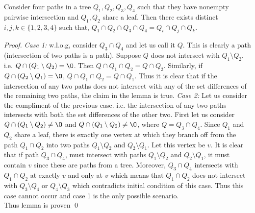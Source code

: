 \documentclass[MS]             %
              {iitmdiss_as}    %
\begin{document}
\begin{lemma}
  \label{lem:fourpaths} Consider four paths in a tree $Q_1, Q_2, Q_3,
  Q_4$ such that they have nonempty pairwise intersection and $Q_1,
  Q_2$ share a leaf. Then there exists distinct $i, j, k \in
  \{1,2,3,4\}$ such that, $Q_1 \cap Q_2 \cap Q_3 \cap Q_4 = Q_i \cap
  Q_j \cap Q_k$.
\end{lemma}
\begin{proof}
  {\em Case 1:} w.l.o.g, consider $Q_3 \cap Q_4$ and let us call it
  $Q$. This is clearly a path (intersection of two paths is a path).
  Suppose $Q$ does not intersect with $Q_1 \setminus Q_2$, i.e. $Q
  \cap (Q_1 \setminus Q_2) = \O$. Then $Q \cap Q_1 \cap Q_2 = Q \cap
  Q_2$. Similarly, if $Q \cap (Q_2 \setminus Q_1) = \O$, $Q \cap Q_1
  \cap Q_2 = Q \cap Q_1$. Thus it is clear that if the intersection of
  any two paths does not intersect with any of the set differences of
  the remaining two paths, the claim in the lemma is true.
  {\em Case 2:} Let us consider the compliment of the previous
  case. i.e. the intersection of any two paths intersects with both
  the set differences of the other two. First let us consider $Q \cap
  (Q_1 \setminus Q_2) \ne \O$ and $Q \cap (Q_1 \setminus Q_2) \ne \O$,
  where $Q = Q_3 \cap Q_4$. Since $Q_1$ and $Q_2$ share a leaf, there
  is exactly one vertex at which they branch off from the path $Q_1
  \cap Q_2$ into two paths $Q_1 \setminus Q_2$ and $Q_2 \setminus
  Q_1$. Let this vertex be $v$. It is clear that if path $Q_3 \cap
  Q_4$, must intersect with paths $Q_1 \setminus Q_2$ and $Q_2
  \setminus Q_1$, it must contain $v$ since these are paths from a
  tree. Moreover, $Q_3 \cap Q_4$ intersects with $Q_1 \cap Q_2$ at
  exactly $v$ and only at $v$ which means that $Q_1 \cap Q_2$ does not
  intersect with $Q_3 \setminus Q_4$ or $Q_4 \setminus Q_3$ which
  contradicts initial condition of this case. Thus this
  case cannot occur and case 1 is the only possible scenario. \\
  Thus lemma is proven \qed
\end{proof}
\end{document}
